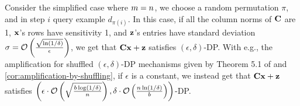 \documentclass{article}
\begin{document}

\begin{example}
Consider the simplified case where $m = n$, we choose a random permutation $\pi$, and in step $i$ query example $d_{\pi(i)}$. In this case, if all the column norms of $\mathbf{C}$ are 1, $\mathbf{x}$'s rows have sensitivity 1, and $\mathbf{z}$'s entries have standard deviation $\sigma = \mathcal{O}\left(\frac{\sqrt{\ln(1/\delta)}}{\epsilon}\right)$, we get that $\mathbf{C} \mathbf{x} + \mathbf{z}$ satisfies $(\epsilon, \delta)$-DP. With e.g., the amplification for shuffled $(\epsilon, \delta)$-DP mechanisms given by Theorem 5.1 of \cite{balle2020privacy} and \cref{cor:amplification-by-shuffling}, if $\epsilon$ is a constant, we instead get that $\mathbf{C} \mathbf{x} + \mathbf{z}$ satisfies $\left(\epsilon \cdot \mathcal{O}\left(\sqrt{\frac{b \log(1/\delta)}{n}}\right), \delta \cdot \mathcal{O}\left(\frac{n  \ln(1/\delta)}{b}\right)\right)$-DP.
\end{example}

\end{document}
